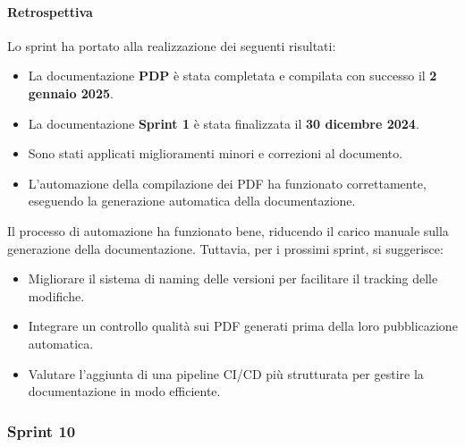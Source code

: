 \documentclass{article}
\begin{document}
                \paragraph{Retrospettiva}
                Lo sprint ha portato alla realizzazione dei seguenti risultati:
                \begin{itemize}
                    \item La documentazione \textbf{PDP} è stata completata e compilata con successo il \textbf{2 gennaio 2025}.
                    \item La documentazione \textbf{Sprint 1} è stata finalizzata il \textbf{30 dicembre 2024}.
                    \item Sono stati applicati miglioramenti minori e correzioni al documento.
                    \item L'automazione della compilazione dei PDF ha funzionato correttamente, eseguendo la generazione automatica della documentazione.
                \end{itemize}
                
                Il processo di automazione ha funzionato bene, riducendo il carico manuale sulla generazione della documentazione. Tuttavia, per i prossimi sprint, si suggerisce:
                \begin{itemize}
                    \item Migliorare il sistema di naming delle versioni per facilitare il tracking delle modifiche.
                    \item Integrare un controllo qualità sui PDF generati prima della loro pubblicazione automatica.
                    \item Valutare l'aggiunta di una pipeline CI/CD più strutturata per gestire la documentazione in modo efficiente.
                \end{itemize}
            \subsubsection{Sprint 10}
\end{document}
